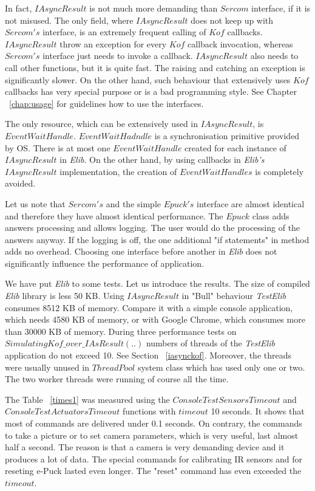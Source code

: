 	In fact, $IAsyncResult$ is not much more demanding than $Sercom$ interface, if it is not misused.
	The only field, where $IAsyncResult$ does not keep up with $Sercom's$ interface, 
	is an extremely frequent calling of $Kof$ callbacks.
	$IAsyncResult$ throw an exception for every $Kof$ callback invocation, 
	whereas $Sercom's$ interface just needs to invoke a callback.
	$IAsyncResult$ also needs to call other functions, but it is quite fast. 
	The raising and catching an exception is significantly slower.
	On the other hand, such behaviour that extensively uses $Kof$ callbacks 
	has very special purpose or is a bad programming style.
	See Chapter ~\ref{chap:usage} for guidelines how to use the interfaces.

	The only resource, which can be extensively used in $IAsyncResult$, is $EventWaitHandle$. 
	$EventWaitHadndle$ is a synchronisation primitive provided
	by OS. There is at most one $EventWaitHandle$ created for each instance of $IAsyncResult$ in {\it Elib}. 
	On the other hand, by using callbacks in {\it Elib's} $IAsyncResult$
	implementation, the creation of $EventWaitHandles$ is completely avoided.

	Let us note that $Sercom's$ and the simple $Epuck's$ interface 
	are almost identical and therefore they have almost identical performance.
	The $Epuck$ class adds answers processing and allows logging. The user would do the processing of the answers anyway.
	If the logging is off, the one additional "if statements" in method adds no overhead. 
	Choosing one interface before another in {\it Elib} does not significantly influence the performance of application.

	We have put {\it Elib} to some tests. Let us introduce the results.
	The size of compiled {\it Elib} library is less 50 KB.
	Using $IAsyncResult$ in "Bull" behaviour  {\it TestElib} consumes 8512 KB of memory.
	Compare it with a simple console application, which needs 4580 KB of memory, or with Google Chrome, 
	which consumes more than 30000 KB of memory.
	During three performance tests on $SimulatingKof\_over\_IAsResult(..)$
	numbers of threads of the {\it TestElib} application do not exceed 10. 
	See Section ~\ref{iasynckof}. Moreover, the threads were usually unused
	in $ThreadPool$ system class which has used only one or two. 
	The two worker threads were running of course all the time.

	The Table ~\ref{times1}  was measured using the $ConsoleTestSensorsTimeout$ and
	$ConsoleTestActuatorsTimeout$ functions with $timeout$ 10 seconds.
	It shows that most of commands are delivered under 0.1 seconds. 
	On contrary, the commands to take a picture or to set camera parameters, 
	which is very useful, last almost half a second. 
	The reason is that a camera is very demanding device and it produces a lot of data.
	The special commands for calibrating IR sensors and for reseting e-Puck lasted even longer.
	The "reset" command has even exceeded the $timeout$.


